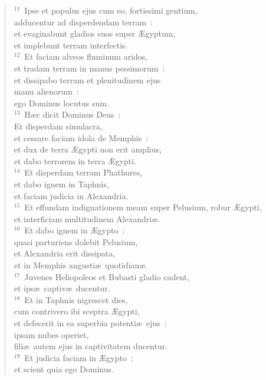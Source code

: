 \begin{flushleft}
\begin{verse}
${}^{11}$~Ipse et populus ejus cum eo, fortissimi gentium,\\ adducentur ad disperdendam terram~:\\ et evaginabunt gladios suos super \AE gyptum,\\ et implebunt terram interfectis.\\
${}^{12}$~Et faciam alveos fluminum aridos,\\ et tradam terram in manus pessimorum~:\\ et dissipabo terram et plenitudinem ejus\\ manu alienorum~:\\ ego Dominus locutus sum.\\
${}^{13}$~H\ae c dicit Dominus Deus~:\\ Et disperdam simulacra,\\ et cessare faciam idola de Memphis~:\\ et dux de terra \AE gypti non erit amplius,\\ et dabo terrorem in terra \AE gypti.\\
${}^{14}$~Et disperdam terram Phathures,\\ et dabo ignem in Taphnis,\\ et faciam judicia in Alexandria.\\
${}^{15}$~Et effundam indignationem meam super Pelusium, robur \AE gypti,\\ et interficiam multitudinem Alexandri\ae .\\
${}^{16}$~Et dabo ignem in \AE gypto~:\\ quasi parturiens dolebit Pelusium,\\ et Alexandria erit dissipata,\\ et in Memphis angusti\ae\ quotidian\ae .\\
${}^{17}$~Juvenes Heliopoleos et Bubasti gladio cadent,\\ et ips\ae\ captiv\ae\ ducentur.\\
${}^{18}$~Et in Taphnis nigrescet dies,\\ cum contrivero ibi sceptra \AE gypti,\\ et defecerit in ea superbia potenti\ae\ ejus~:\\ ipsam nubes operiet,\\ fili\ae\ autem ejus in captivitatem ducentur.\\
${}^{19}$~Et judicia faciam in \AE gypto~:\\ et scient quia ego Dominus.\end{verse}\end{flushleft}


